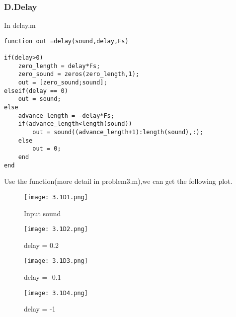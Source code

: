\documentclass{article}
\begin{document}
\subsubsection*{D.Delay}
In delay.m
\begin{lstlisting}
function out =delay(sound,delay,Fs)

if(delay>0)
    zero_length = delay*Fs;
    zero_sound = zeros(zero_length,1);
    out = [zero_sound;sound];
elseif(delay == 0)
    out = sound;
else
    advance_length = -delay*Fs;
    if(advance_length<length(sound))
        out = sound((advance_length+1):length(sound),:);
    else
        out = 0;
    end
end
\end{lstlisting}
Use the function(more detail in problem3.m),we can get the following plot.
\begin{figure}[h]
    \begin{minipage}{0.45\textwidth}
        \centering
        \texttt{[image: 3.1D1.png]}
        \caption{Input sound}
    \end{minipage}
    \begin{minipage}{0.45\textwidth}
        \centering
        \texttt{[image: 3.1D2.png]}
        \caption{delay = 0.2}
    \end{minipage}
    \quad

    \begin{minipage}{0.45\textwidth}
        \centering
        \texttt{[image: 3.1D3.png]}
        \caption{delay = -0.1}
    \end{minipage}
    \begin{minipage}{0.45\textwidth}
        \centering
        \texttt{[image: 3.1D4.png]}
        \caption{delay = -1}
    \end{minipage}
\end{figure}
\end{document}
